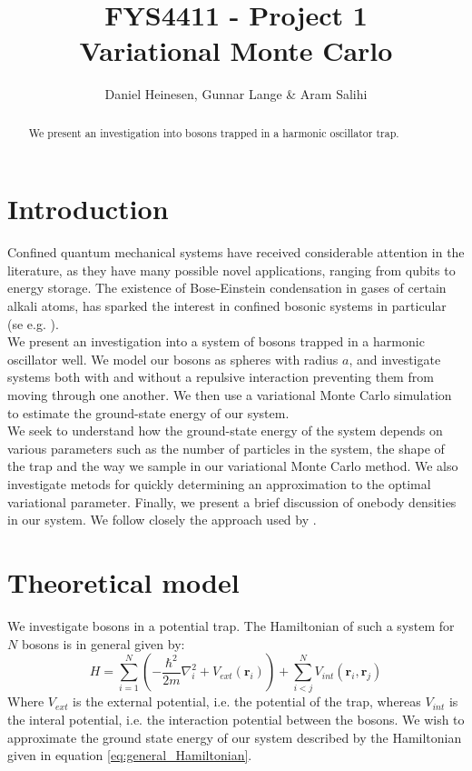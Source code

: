 \documentclass[a4paper, 10pt]{article}
\title{FYS4411 - Project 1\\
	Variational Monte Carlo}
\author{Daniel Heinesen, Gunnar Lange \& Aram Salihi}
\begin{document}
	\maketitle
	\begin{abstract}
	We present an investigation into bosons trapped in a harmonic oscillator trap. 
	\end{abstract}
	\tableofcontents
	\section{Introduction}
	Confined quantum mechanical systems have received considerable attention in the literature, as they have many possible novel applications, ranging from qubits to energy storage. The existence of Bose-Einstein condensation in gases of certain alkali atoms, has sparked the interest in confined bosonic systems in particular (se e.g. \cite{Nilsen2005}). \\
	\linebreak
	We present an investigation into a system of bosons trapped in a harmonic oscillator well. We model our bosons as spheres with radius $a$, and investigate systems both with and without a repulsive interaction preventing them from moving through one another. We then use a variational Monte Carlo simulation to estimate the ground-state energy of our system.\\
	\linebreak
	 We seek to understand how the ground-state energy of the system depends on various parameters such as the number of particles in the system, the shape of the trap and the way we sample in our variational Monte Carlo method. We also investigate metods for quickly determining an approximation to the optimal variational parameter. Finally, we present a brief discussion of onebody densities in our system. We follow closely the approach used by \cite{DuBois2001}.
	\section{Theoretical model}
	We investigate bosons in a potential trap. The Hamiltonian of such a system for $N$ bosons is in general given by:
	\begin{equation} \label{eq:general_Hamiltonian}
	H=\sum_{i=1}^N\left(-\frac{\hbar^2}{2m}\nabla_i^2 +V_{ext}(\boldsymbol{r}_i)\right)+\sum_{i<j}^N V_{int}(\boldsymbol{r}_i, \boldsymbol{r}_j)
	\end{equation}
	Where $V_{ext}$ is the external potential, i.e. the potential of the trap, whereas $V_{int}$ is the interal potential, i.e. the interaction potential between the bosons. We wish to approximate the ground state energy of our system described by the Hamiltonian given in equation \ref{eq:general_Hamiltonian}.
\end{document}
